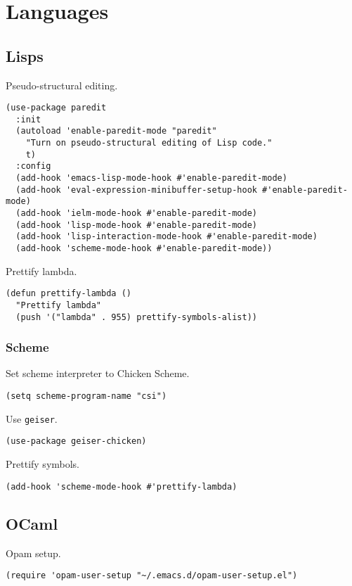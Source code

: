 \documentclass[a4paper,11pt]{article}
\begin{document}
\section{Languages}
\label{sec:org0078744}
\subsection{Lisps}
\label{sec:org847fd0f}
Pseudo-structural editing.
\begin{verbatim}
(use-package paredit
  :init
  (autoload 'enable-paredit-mode "paredit"
    "Turn on pseudo-structural editing of Lisp code."
    t)
  :config
  (add-hook 'emacs-lisp-mode-hook #'enable-paredit-mode)
  (add-hook 'eval-expression-minibuffer-setup-hook #'enable-paredit-mode)
  (add-hook 'ielm-mode-hook #'enable-paredit-mode)
  (add-hook 'lisp-mode-hook #'enable-paredit-mode)
  (add-hook 'lisp-interaction-mode-hook #'enable-paredit-mode)
  (add-hook 'scheme-mode-hook #'enable-paredit-mode))
\end{verbatim}

Prettify lambda.
\begin{verbatim}
(defun prettify-lambda ()
  "Prettify lambda"
  (push '("lambda" . 955) prettify-symbols-alist))
\end{verbatim}

\subsubsection{Scheme}
\label{sec:orgf3cf697}
Set scheme interpreter to Chicken Scheme.
\begin{verbatim}
(setq scheme-program-name "csi")
\end{verbatim}

Use \texttt{geiser}.
\begin{verbatim}
(use-package geiser-chicken)
\end{verbatim}

Prettify symbols.
\begin{verbatim}
(add-hook 'scheme-mode-hook #'prettify-lambda)
\end{verbatim}

\subsection{OCaml}
\label{sec:orgfcab065}
Opam setup.
\begin{verbatim}
(require 'opam-user-setup "~/.emacs.d/opam-user-setup.el")
\end{verbatim}
\end{document}
